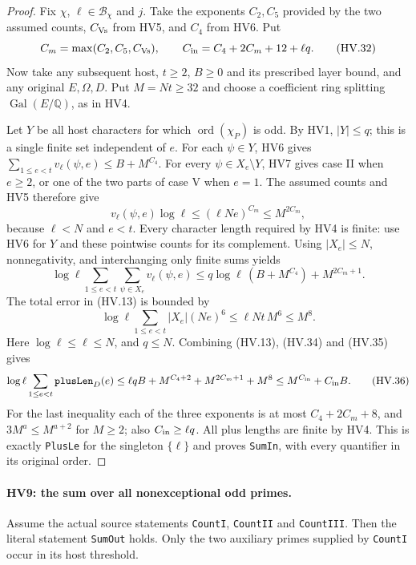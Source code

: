 \begin{proof}
Fix $\chi$, $\ell\in\mathcal B_\chi$ and $j$.
Take the exponents $C_2,C_5$ provided by the two assumed
counts, $C_{\rm Vs}$ from HV5, and $C_4$ from HV6.
Put
\[
 C_m=\max(C_2,C_5,C_{\rm Vs}),\qquad
 C_{\rm in}=C_4+2C_m+12+\ell q.
 \tag{HV.32}
\]
Now take any subsequent host, $t\ge2$, $B\ge0$ and its
prescribed layer bound, and any original $E,\Omega,D$.
Put $M=Nt\ge32$ and choose a coefficient ring splitting
$\operatorname{Gal}(E/\mathbb Q)$, as in HV4.

Let $Y$ be all host characters for which
$\operatorname{ord}(\chi_P)$ is odd.  By HV1, $|Y|\le q$;
this is a single finite set independent of $e$.
For each $\psi\in Y$, HV6 gives
$\sum_{1\le e<t}v_\ell(\psi,e)\le B+M^{C_4}$.
For every $\psi\in X_e\setminus Y$, HV7 gives case II
when $e\ge2$, or one of the two parts of case V when $e=1$.
The assumed counts and HV5 therefore give
\[
          v_\ell(\psi,e)\log\ell
                \le(\ell Ne)^{C_m}\le M^{2C_m},
 \tag{HV.33}
\]
because $\ell<N$ and $e<t$.
Every character length required by HV4 is finite: use HV6
for $Y$ and these pointwise counts for its complement.
Using $|X_e|\le N$, nonnegativity, and interchanging only
finite sums yields
\[
 \log\ell\sum_{1\le e<t}\sum_{\psi\in X_e}v_\ell(\psi,e)
 \le q\log\ell\,(B+M^{C_4})+M^{2C_m+1}.
 \tag{HV.34}
\]
The total error in (HV.13) is bounded by
\[
 \log\ell\sum_{1\le e<t}|X_e|(Ne)^6
             \le\ell Nt\,M^6\le M^8.
 \tag{HV.35}
\]
Here $\log\ell\le\ell\le N$, and $q\le N$.
Combining (HV.13), (HV.34) and (HV.35) gives
\[
 \log\ell\sum_{1\le e<t}\mathtt{plusLen}_D(e)
 \le\ell q B+M^{C_4+2}+M^{2C_m+1}+M^8
 \le M^{C_{\rm in}}+C_{\rm in}B.
 \tag{HV.36}
\]
For the last inequality each of the three exponents is at
most $C_4+2C_m+8$, and $3M^a\le M^{a+2}$ for $M\ge2$;
also $C_{\rm in}\ge\ell q$.
All plus lengths are finite by HV4.
This is exactly \texttt{PlusLe} for the singleton $\{\ell\}$
and proves \texttt{SumIn}, with every quantifier in its
original order.
\end{proof}

\paragraph{HV9: the sum over all nonexceptional odd primes.}
\label{claim:HV9}
Assume the actual source statements \texttt{CountI},
\texttt{CountII} and \texttt{CountIII}.  Then the literal
statement \texttt{SumOut} holds.  Only the two auxiliary
primes supplied by \texttt{CountI} occur in its host threshold.

